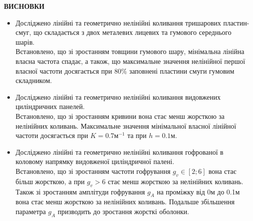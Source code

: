 \documentclass[8pt]{beamer}
\numberwithin{figure}{section}
\numberwithin{equation}{section}
\numberwithin{table}{section}
\begin{document}
\begin{frame}
\textbf{\large ВИСНОВКИ}
\\
\vspace{1em}
\begin{itemize}
\item Досліджено лінійні та геометрично нелінійні коливання тришарових пластин-смуг, що складається з двох металевих лицевих та гумового середнього шарів. \\Встановлено, що зі зростанням товщини гумового шару, мінімальна лінійна власна частота спадає, а також, що максимальне значення нелінійної першої власної частоти досягається при 80\% заповнені пластини смуги гумовим складником. 
\item Досліджено лінійні та геометрично нелінійні коливання видовжених циліндричних панелей.\\ Встановлено, що зі зростанням кривини вона стає менш жорсткою за нелінійних коливань. Максимальне значення мінімальної власної лінійної частоти досягається при $K=0.7 м^{-1}$ та при $h=0.1 м$.
\item Досліджено лінійні та геометрично нелінійні коливання гофрованої в коловому напрямку видовженої циліндричної палені. \\Встановлено, що зі зростанням частоти гофрування $g_v \in [2;6]$ вона стає більш жорсткою, а при $g_v > 6$ стає менш жорсткою за нелінійних коливань. Також зі зростанням амплітуди гофрування $g_A$ на проміжку від 0м до 0.1м вона стає менш жорсткою за нелінійних коливань. Подальше збільшення параметра $g_A$ призводить до зростання жорсткі оболонки.

\end{itemize}



\end{frame}
\end{document}
